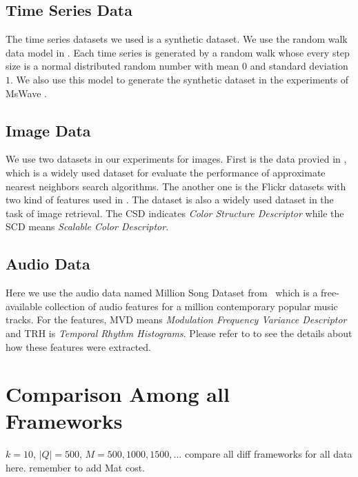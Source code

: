\subsection{Time Series Data} %
\label{ssb:time}
The time series datasets we used is a synthetic dataset.  We use the random walk data model in \cite{time}.  Each time series is generated by a random walk whose every step size is a normal distributed random number with mean $0$ and standard deviation $1$.  We also use this model to generate the synthetic dataset in the experiments of MsWave \cite{MsWave}.

\subsection{Image Data} %
\label{ss:Image}
We use two datasets in our experiments for images.  First is the data provied in \cite{ANN}, which is a widely used dataset for evaluate the performance of approximate nearest neighbors search algorithms.  The another one is the Flickr datasets with two kind of features used in \cite{Flickr}.  The dataset is also a widely used dataset in the task of image retrieval.  The CSD indicates \emph{Color Structure Descriptor} while the SCD means \emph{Scalable Color Descriptor}.

\subsection{Audio Data} %
\label{sub:audio_data}
Here we use the audio data named Million Song Dataset from~\cite{Bertin-Mahieux2011} which is a free-available collection of audio features for a million contemporary popular music tracks. For the features, MVD means \emph{Modulation Frequency Variance Descriptor} and TRH is \emph{Temporal Rhythm Histograms}.  Please refer to \cite{LID_05ismir,RAU_03jnmr,RAU_01ecdl} to see the details about how these features were extracted.


\section{Comparison Among all Frameworks} %
\label{s:comparison_among_all_frameworks}

$k=10$, $|Q|=500$, $M=500,1000,1500,...$
compare all diff frameworks for all data here. remember to add Mat cost.

